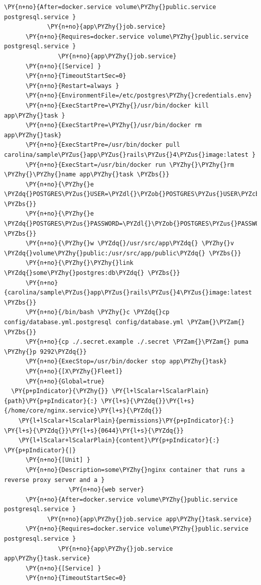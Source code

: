 \begin{codelisting}
\begin{Verbatim}[fontsize=\relsize{-2.5},fontseries=b,commandchars=\\\{\}]
      \PY{n+no}{After=docker.service volume\PYZhy{}public.service postgresql.service }
            \PY{n+no}{app\PYZhy{}job.service}
      \PY{n+no}{Requires=docker.service volume\PYZhy{}public.service postgresql.service }
               \PY{n+no}{app\PYZhy{}job.service}
      \PY{n+no}{[Service] }
      \PY{n+no}{TimeoutStartSec=0}
      \PY{n+no}{Restart=always }
      \PY{n+no}{EnvironmentFile=/etc/postgres\PYZhy{}credentials.env}
      \PY{n+no}{ExecStartPre=\PYZhy{}/usr/bin/docker kill app\PYZhy{}task }
      \PY{n+no}{ExecStartPre=\PYZhy{}/usr/bin/docker rm app\PYZhy{}task}
      \PY{n+no}{ExecStartPre=/usr/bin/docker pull carolina/sample\PYZus{}app\PYZus{}rails\PYZus{}4\PYZus{}image:latest }
      \PY{n+no}{ExecStart=/usr/bin/docker run \PYZhy{}\PYZhy{}rm \PYZhy{}\PYZhy{}name app\PYZhy{}task \PYZbs{}}
      \PY{n+no}{\PYZhy{}e \PYZdq{}POSTGRES\PYZus{}USER=\PYZdl{}\PYZob{}POSTGRES\PYZus{}USER\PYZcb{}\PYZdq{} \PYZbs{}}
      \PY{n+no}{\PYZhy{}e \PYZdq{}POSTGRES\PYZus{}PASSWORD=\PYZdl{}\PYZob{}POSTGRES\PYZus{}PASSWORD\PYZcb{}\PYZdq{} \PYZbs{}}
      \PY{n+no}{\PYZhy{}w \PYZdq{}/usr/src/app\PYZdq{} \PYZhy{}v \PYZdq{}volume\PYZhy{}public:/usr/src/app/public\PYZdq{} \PYZbs{}}
      \PY{n+no}{\PYZhy{}\PYZhy{}link \PYZdq{}some\PYZhy{}postgres:db\PYZdq{} \PYZbs{}}
      \PY{n+no}{carolina/sample\PYZus{}app\PYZus{}rails\PYZus{}4\PYZus{}image:latest \PYZbs{}}
      \PY{n+no}{/bin/bash \PYZhy{}c \PYZdq{}cp config/database.yml.postgresql config/database.yml \PYZam{}\PYZam{} \PYZbs{}}
      \PY{n+no}{cp ./.secret.example ./.secret \PYZam{}\PYZam{} puma \PYZhy{}p 9292\PYZdq{}}
      \PY{n+no}{ExecStop=/usr/bin/docker stop app\PYZhy{}task}
      \PY{n+no}{[X\PYZhy{}Fleet]}
      \PY{n+no}{Global=true}
  \PY{p+pIndicator}{\PYZhy{}} \PY{l+lScalar+lScalarPlain}{path}\PY{p+pIndicator}{:} \PY{l+s}{\PYZdq{}}\PY{l+s}{/home/core/nginx.service}\PY{l+s}{\PYZdq{}}
    \PY{l+lScalar+lScalarPlain}{permissions}\PY{p+pIndicator}{:} \PY{l+s}{\PYZdq{}}\PY{l+s}{0644}\PY{l+s}{\PYZdq{}}
    \PY{l+lScalar+lScalarPlain}{content}\PY{p+pIndicator}{:} \PY{p+pIndicator}{|}
      \PY{n+no}{[Unit] }
      \PY{n+no}{Description=some\PYZhy{}nginx container that runs a reverse proxy server and a }
                  \PY{n+no}{web server}
      \PY{n+no}{After=docker.service volume\PYZhy{}public.service postgresql.service }
            \PY{n+no}{app\PYZhy{}job.service app\PYZhy{}task.service}
      \PY{n+no}{Requires=docker.service volume\PYZhy{}public.service postgresql.service }
               \PY{n+no}{app\PYZhy{}job.service app\PYZhy{}task.service}
      \PY{n+no}{[Service] }
      \PY{n+no}{TimeoutStartSec=0}

\end{Verbatim}
\end{codelisting}

